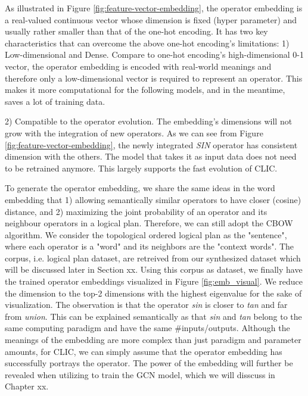 As illustrated in Figure \ref{fig:feature-vector-embedding}, 
the operator embedding is a real-valued continuous vector whose dimension is fixed (hyper parameter) and usually rather smaller than that of the one-hot encoding.
It has two key characteristics that can overcome the above one-hot encoding's limitations:
1) Low-dimensional and Dense. 
Compare to one-hot encoding's high-dimensional 0-1 vector, 
the operator embedding is encoded with real-world meanings and therefore only a low-dimensional vector is required to represent an operator.
This makes it more computational for the following models, and in the meantime, saves a lot of training data.

2) Compatible to the operator evolution. The embedding's dimensions will not grow with the integration of new operators. 
As we can see from Figure \ref{fig:feature-vector-embedding}, the newly integrated \textit{SIN} operator has consistent dimension with the others.
The model that takes it as input data does not need to be retrained anymore. 
This largely supports the fast evolution of CLIC.

To generate the operator embedding, we share the same ideas in the word embedding that
1) allowing semantically similar operators to have closer (cosine) distance, 
and 2) maximizing the joint probability of an operator and its neighbour operators in a logical plan.
Therefore, we can still adopt the CBOW algorithm.
We consider the topological ordered logical plan as the "sentence", where each operator is a "word" and its neighbors are the "context words". 
The corpus, i.e. logical plan dataset, are retreived from our synthesized dataset which will be discussed later in Section xx.
Using this corpus as dataset, we finally have the trained operator embeddings visualized in Figure \ref{fig:emb_visual}.
We reduce the dimension to the top-2 dimensions with the highest eigenvalue for the sake of visualization.
The observation is that the operator \textit{sin} is closer to \textit{tan} and far from \textit{union}.
This can be explained semantically as that \textit{sin} and \textit{tan} belong to the same computing paradigm and have the same \#inputs/outputs.
Although the meanings of the embedding are more complex than just paradigm and parameter amounts, 
for CLIC, 
we can simply assume that the operator embedding has successfully portrays the operator.
The power of the embedding will further be revealed when utilizing to train the GCN model, which we will disscuss in Chapter xx.

